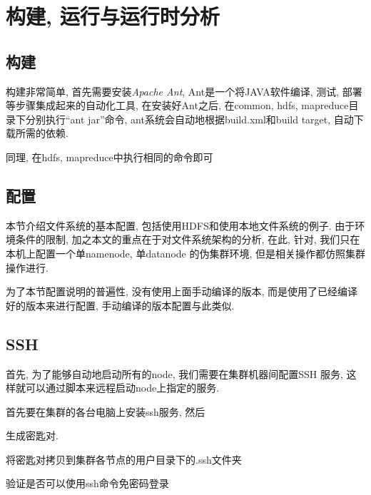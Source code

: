 %
\chapter{构建, 运行与运行时分析}
\label{ch:env}

\section{构建}

构建{\Hadoop}非常简单, 首先需要安装\emph{Apache Ant}, Ant是一个将JAVA软件编译, 测试,
部署等步骤集成起来的自动化工具, 在安装好Ant之后,
在common, hdfs, mapreduce目录下分别执行``ant jar''命令,
ant系统会自动地根据build.xml和build target, 自动下载所需的依赖.



同理, 在hdfs, mapreduce中执行相同的命令即可

\section{配置}

本节介绍{\Hadoop}文件系统的基本配置, 包括使用HDFS和使用本地文件系统的例子.
由于环境条件的限制, 加之本文的重点在于对{\Hadoop}文件系统架构的分析,
在此, 针对{\HDFS}, 我们只在本机上配置一个单namenode, 单datanode
的伪集群环境, 但是相关操作都仿照集群操作进行.

为了本节配置说明的普遍性, 没有使用上面手动编译的版本, 而是使用了已经编译好的版本来进行配置,
手动编译的版本配置与此类似.

\section{SSH}

首先, 为了能够自动地启动所有的node, 我们需要在集群机器间配置SSH
服务, 这样就可以通过脚本来远程启动node上指定的服务.

首先要在集群的各台电脑上安装ssh服务, 然后


生成密匙对.


将密匙对拷贝到集群各节点的用户目录下的.ssh文件夹


验证是否可以使用ssh命令免密码登录


